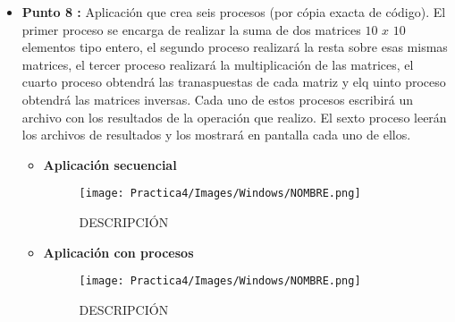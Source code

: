 \documentclass[12pt]{article}
\begin{document}
\begin{itemize}

            \item[\Checkmark] \textbf{Punto 8 :}
                 Aplicación que crea seis procesos (por cópia exacta de código). El primer proceso se encarga de realizar la suma de dos matrices $10$ $x$ $10$ elementos tipo entero, el segundo proceso realizará la resta sobre esas mismas matrices, el tercer proceso realizará la multiplicación de las matrices, el cuarto proceso obtendrá las tranaspuestas de cada matriz y elq uinto proceso obtendrá las matrices inversas. Cada uno de estos procesos escribirá un archivo con los resultados de la operación que realizo. El sexto proceso leerán los archivos de resultados y los mostrará en pantalla cada uno de ellos.

                \begin{itemize}
                    \item \textbf{Aplicación secuencial}
                        \begin{figure}[h!]
                            \centering
                            \texttt{[image: Practica4/Images/Windows/NOMBRE.png]}
                            \caption{DESCRIPCIÓN}
                        \end{figure}


                    \item \textbf{Aplicación con procesos}
                        \begin{figure}[h!]
                            \centering
                            \texttt{[image: Practica4/Images/Windows/NOMBRE.png]}
                            \caption{DESCRIPCIÓN}
                        \end{figure}

                \end{itemize}
            
        \end{itemize}
        
         
    \newpage
\end{document}
